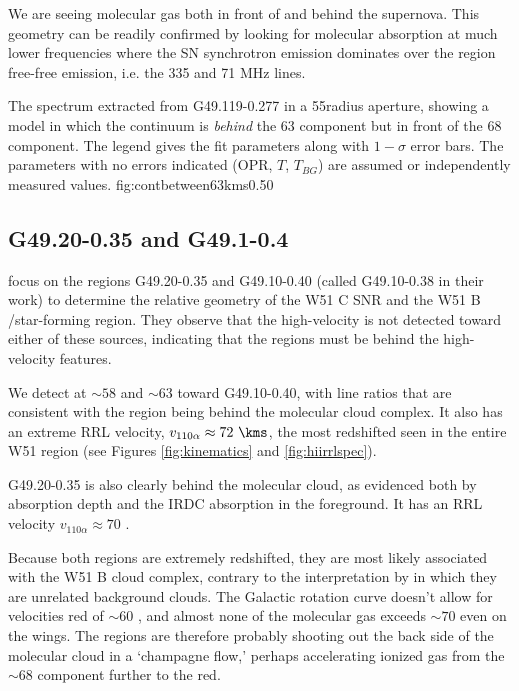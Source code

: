 We are seeing molecular gas both in front of and behind the supernova.  This
geometry can be readily confirmed by looking for molecular absorption at much
lower frequencies where the SN synchrotron emission dominates over the \hii
region free-free emission, i.e. the 335 and 71 MHz \para lines.

{The spectrum extracted from G49.119-0.277 in a 55\arcsec radius aperture,
showing a model in which the continuum is \emph{behind} the 63 \kms component
but in front of the 68 \kms component.  The legend gives the fit parameters
along with $1-\sigma$ error bars.  The parameters with no errors indicated
(OPR, $T$, $T_{BG}$) are assumed or independently measured values.}
{fig:contbetween63kms}{0.5}{0}

\subsection{G49.20-0.35 and G49.1-0.4}
\citet{Tian2013a} focus on the \hii regions G49.20-0.35 and G49.10-0.40 (called
G49.10-0.38 in their work) to determine the relative geometry
of the W51 C SNR and the W51 B \hii/star-forming region.  They observe that the
high-velocity \hi is not detected toward either of these sources, indicating
that the \hii regions must be behind the high-velocity \hi features.

We detect \formaldehyde \oneone at $\sim58$ and $\sim63$ \kms toward
G49.10-0.40, with line ratios that are consistent with the \hii region being
behind the molecular cloud complex.  It also has an extreme RRL velocity,
$v_{110\alpha} \approx 72~\kms$, the most redshifted seen in the entire W51 region
(see Figures \ref{fig:kinematics} and \ref{fig:hiirrlspec}).

G49.20-0.35 is also clearly behind the molecular cloud, as evidenced both by
\formaldehyde absorption depth and the IRDC absorption in the foreground.
It has an RRL velocity $v_{110\alpha} \approx 70$ \kms.

Because both \hii regions are extremely redshifted, they are most likely
associated with the W51 B cloud complex, contrary to the interpretation by
\citet{Tian2013a} in which they are unrelated background clouds.  The Galactic
rotation curve doesn't allow for velocities red of $\sim60$ \kms, and almost
none of the molecular gas exceeds $\sim70$ \kms even on the wings.  The \hii
regions are therefore probably shooting out the back side of the molecular
cloud in a `champagne flow,' perhaps accelerating ionized gas from the $\sim
68$ \kms component
further to the red.

